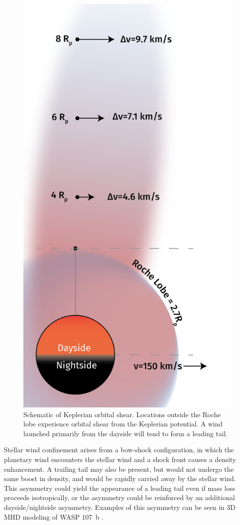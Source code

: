\documentclass[twocolumn]{aastex631}
\begin{document}
\begin{figure}
    \includegraphics[width=0.8\linewidth]{figures/KeplerianShear_v0p3.png}
    \caption{Schematic of Keplerian orbital shear.  Locations outside the Roche lobe experience orbital shear from the Keplerian potential.  A wind launched primarily from the dayside will tend to form a leading tail.}
    \label{fig:KeplerianShear}
\end{figure}


Stellar wind confinement \citep{2022ApJ...926..226M} arises from a bow-shock configuration, in which the planetary wind encounters the stellar wind and a shock front causes a density enhancement.  A trailing tail may also be present, but would not undergo the same boost in density, and would be rapidly carried away by the stellar wind.  This asymmetry could yield the appearance of a leading tail even if mass loss proceeds isotropically, or the asymmetry could be reinforced by an additional dayside/nightside asymmetry.  Examples of this asymmetry can be seen in 3D MHD modeling of WASP 107~b \citep{2022ApJ...926..226M}.
\end{document}
